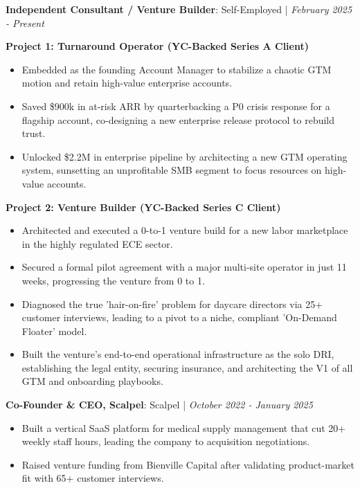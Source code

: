 \documentclass[10pt,a4paper,withhyper]{altacv}
\newcommand{\atscvevent}[4]{%
  \textbf{#1}: #2 | \textit{#3}%
  \vspace{0.3em}%
}
\begin{document}



\makecvheader


\atscvevent{Independent Consultant / Venture Builder}{Self-Employed}{February 2025 - Present}{}

\textbf{Project 1: Turnaround Operator (YC-Backed Series A Client)}
\begin{itemize}
\item Embedded as the founding Account Manager to stabilize a chaotic GTM motion and retain high-value enterprise accounts.
\item Saved \$900k in at-risk ARR by quarterbacking a P0 crisis response for a flagship account, co-designing a new enterprise release protocol to rebuild trust.
\item Unlocked \$2.2M in enterprise pipeline by architecting a new GTM operating system, sunsetting an unprofitable SMB segment to focus resources on high-value accounts.
\end{itemize}

\textbf{Project 2: Venture Builder (YC-Backed Series C Client)}
\begin{itemize}
\item Architected and executed a 0-to-1 venture build for a new labor marketplace in the highly regulated ECE sector.
\item Secured a formal pilot agreement with a major multi-site operator in just 11 weeks, progressing the venture from 0 to 1.
\item Diagnosed the true 'hair-on-fire' problem for daycare directors via 25+ customer interviews, leading to a pivot to a niche, compliant 'On-Demand Floater' model.
\item Built the venture's end-to-end operational infrastructure as the solo DRI, establishing the legal entity, securing insurance, and architecting the V1 of all GTM and onboarding playbooks.
\end{itemize}

\atscvevent{Co-Founder \& CEO, Scalpel}{Scalpel}{October 2022 - January 2025}{}

\begin{itemize}
\item Built a vertical SaaS platform for medical supply management that cut 20+ weekly staff hours, leading the company to acquisition negotiations.
\item Raised venture funding from Bienville Capital after validating product-market fit with 65+ customer interviews.
\end{itemize}
\end{document}
